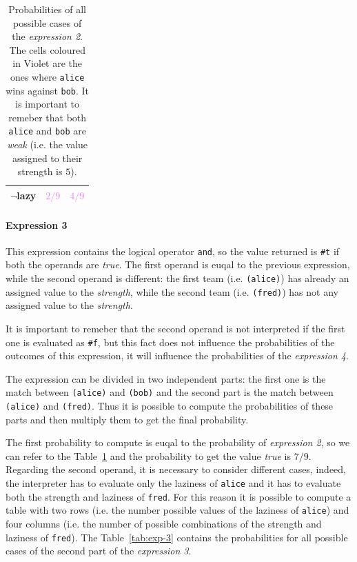 \begin{itemize}
\begin{table}[H]
\begin{tabular}{| c | c c|}
                    \textbf{$\neg$lazy} & \textcolor{Violet}{$2/9$} & \textcolor{Violet}{$4/9$} \\ 
                    \hline
                \end{tabular}
            \egroup
            \caption{
                Probabilities of all possible cases of the \textit{expression 2}. The cells coloured in Violet are the ones where
                \texttt{\textquotesingle alice} wins against \texttt{\textquotesingle bob}.
                It is important to remeber that both \texttt{\textquotesingle alice} and \texttt{\textquotesingle bob} are \textit{weak} (i.e. the value assigned to
                their strength is $5$).
            }
            \label{tab:exp-2}
        \end{table}

        \paragraph*{Expression 3} This expression contains the logical operator \texttt{and}, so the value returned is \texttt{\#t}
        if both the operands are \textit{true}. The first operand is euqal to the previous expression, while the second operand
        is different: the first team (i.e. \texttt{\textquotesingle (alice)}) has already an assigned value to the \textit{strength}, while the second 
        team (i.e. \texttt{\textquotesingle (fred)}) has not any assigned value to the \textit{strength}.

        It is important to remeber that the second operand is not interpreted if the first one is evaluated as \texttt{\#f}, but this
        fact does not influence the probabilities of the outcomes of this expression, it will influence the probabilities of the
        \textit{expression 4}.

        The expression can be divided in two independent parts: the first one is the match between \texttt{\textquotesingle (alice)} and 
        \texttt{\textquotesingle (bob)} and the second part is the match between \texttt{\textquotesingle (alice)} and \texttt{\textquotesingle (fred)}. Thus it is possible
        to compute the probabilities of these parts and then multiply them to get the final probability.
        
        The first probability to compute is euqal to the probability of \textit{expression 2}, so we can refer to the 
        Table~\ref{tab:exp-2} and the probability to get the value \textit{true} is $7/9$.
        Regarding the second operand, it is necessary to consider different cases, indeed, the interpreter has to evaluate only the
        laziness of \texttt{\textquotesingle alice} and it has to evaluate both the strength and laziness of \texttt{\textquotesingle fred}. For this reason it is
        possible to compute a table with two rows (i.e. the number possible values of the laziness of \texttt{\textquotesingle alice}) and four columns
        (i.e. the number of possible combinations of the strength and laziness of \texttt{\textquotesingle fred}).
        The Table~\ref{tab:exp-3} contains the probabilities for all possible cases of the second part of the \textit{expression 3}.


\end{itemize}
